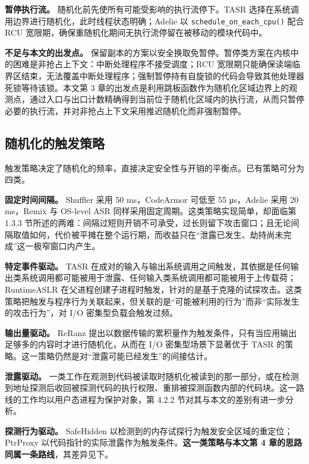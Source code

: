 \textbf{暂停执行流。} 随机化前先使所有可能受影响的执行流停下。TASR 选择在系统调用边界进行随机化，此时线程状态明确；Adelie 以 \lstinline[breaklines=false]@schedule_on_each_cpu()@ 配合 RCU 宽限期，确保重随机化期间无执行流停留在被移动的模块代码中。

\textbf{不足与本文的出发点。} 保留副本的方案以安全换取免暂停。暂停类方案在内核中的困难是非抢占上下文：中断处理程序不接受调度；RCU 宽限期只能确保读端临界区结束，无法覆盖中断处理程序；强制暂停持有自旋锁的代码会导致其他处理器死锁等待该锁。本文第 3 章的出发点是利用跳板函数作为随机化区域边界上的观测点，通过入口与出口计数精确得到当前位于随机化区域内的执行流，从而只暂停必要的执行流，并对非抢占上下文采用推迟随机化而非强制暂停。

\subsection{随机化的触发策略}

触发策略决定了随机化的频率，直接决定安全性与开销的平衡点。已有策略可分为四类。

\textbf{固定时间间隔。} Shuffler 采用 50 ms，CodeArmor 可低至 55 μs，Adelie 采用 20 ms，Remix 与 OS-level ASR 同样采用固定周期。这类策略实现简单，却面临第 1.3.3 节所述的两难：间隔过短则开销不可承受，过长则留下攻击窗口；且无论间隔取值如何，代价被平摊在整个运行期，而收益只在“泄露已发生、劫持尚未完成”这一极窄窗口内产生。

\textbf{特定事件驱动。} TASR 在成对的输入与输出系统调用之间触发，其依据是任何输出类系统调用都可能被用于泄露、任何输入类系统调用都可能被用于上传载荷；RuntimeASLR 在父进程创建子进程时触发，针对的是基于克隆的试探攻击。这类策略把触发与程序行为关联起来，但关联的是“可能被利用的行为”而非“实际发生的攻击行为”，对 I/O 密集型负载会触发过频。

\textbf{输出量驱动。} ReRanz 提出以数据传输的累积量作为触发条件，只有当应用输出足够多的内容时才进行随机化，从而在 I/O 密集型场景下显著优于 TASR 的策略。这一策略仍然是对“泄露可能已经发生”的间接估计。

\textbf{泄露驱动。} 一类工作在观测到代码被读取时随机化被读到的那一部分\citep{morton2017zombie}，或在检测到地址探测后收回被探测代码的执行权限\citep{li2022mprobe}、重排被探测函数内部的代码块\citep{li2024randomize}。这一路线的工作均以用户态进程为保护对象，第 4.2.2 节对其与本文的差别有进一步分析。

\textbf{探测行为驱动。} SafeHidden 以检测到的内存试探行为触发安全区域的重定位；PtrProxy 以代码指针的实际泄露作为触发条件。\textbf{这一类策略与本文第 4 章的思路同属一条路线}，其差异见下。

